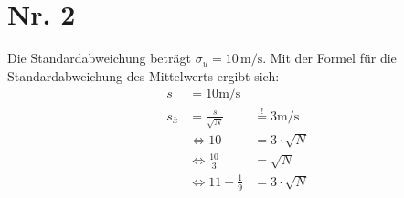 \section*{Nr. 2}
Die Standardabweichung beträgt $\sigma_u = 10\,\mathrm{m/s}$.
Mit der Formel für die Standardabweichung des Mittelwerts ergibt sich:
\begin{align*}
    s               &= 10 \unit{\meter\per\second}                                              \\
    s_{\bar{x}}     &= \frac{s}{\sqrt{N}}           &\stackrel{!}{=} 3\unit{\meter\per\second}  \\ 
    &\Leftrightarrow                             10 &= 3 \cdot \sqrt{N}                         \\ 
    &\Leftrightarrow                    \frac{10}{3}&= \sqrt{N}                                 \\ 
    &\Leftrightarrow        11 + \frac{1}{9}        &= 3 \cdot \sqrt{N}                         \\ 
\end{align*}



